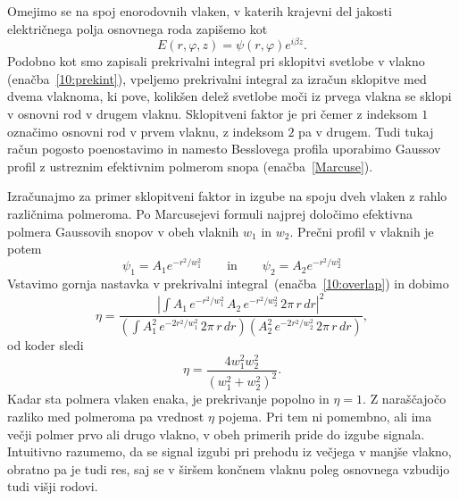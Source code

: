 Omejimo se na spoj enorodovnih vlaken, v katerih krajevni del jakosti 
električnega polja osnovnega roda zapišemo kot
\begin{equation}
E(r, \varphi, z)=\psi(r, \varphi) e^{i\beta z}.
\end{equation} 
Podobno kot smo zapisali prekrivalni integral pri sklopitvi svetlobe v vlakno (enačba~\ref{10:prekint}),
vpeljemo prekrivalni integral za izračun sklopitve med dvema vlaknoma,
ki pove, kolikšen delež svetlobe moči iz prvega vlakna 
se sklopi v osnovni rod v drugem vlaknu. Sklopitveni faktor je
pri čemer z indeksom $1$ označimo osnovni rod v prvem vlaknu, z indeksom $2$ pa 
v drugem. Tudi tukaj račun pogosto poenostavimo in namesto Besslovega profila uporabimo 
Gaussov profil z ustreznim efektivnim polmerom snopa (enačba~\ref{Marcuse}).

Izračunajmo za primer sklopitveni faktor in izgube na spoju dveh vlaken z rahlo 
različnima polmeroma. Po Marcusejevi formuli najprej določimo efektivna polmera Gaussovih snopov
v obeh vlaknih $w_1$ in $w_2$. Prečni profil v vlaknih je potem
\begin{equation}
\psi_{1} = A_{1} e^{-r^2/w_{1}^2} \qquad \mathrm{in} \qquad \psi_{2} = A_{2} e^{-r^2/w_{2}^2}
\end{equation}
Vstavimo gornja nastavka v prekrivalni integral~(enačba~\ref{10:overlap}) in dobimo
\begin{equation}
\eta = \frac{|\int A_1 \, e^{-r^2/w_1^2}\, A_2\, e^{-r^2/w_2^2}\, 2 \pi\, r\, dr|^2}
{\left(\int A_1^2 \,e^{-2r^2/w_1^2} \, 2 \pi \, r\, dr \right) \left( A_2^2\, 
e^{-2r^2/w_2^2}\, 2 \pi \, r\, dr \right)},
\label{10:prekintw}
\end{equation}
od koder sledi
\begin{equation}
\eta = \frac{4 w_1^2 w_2^2}{(w_1^2+w_2^2)^2}.
\label{10:w1w2}
\end{equation}
Kadar sta polmera vlaken enaka, je prekrivanje popolno in $\eta = 1$. Z naraščajočo razliko
med polmeroma pa vrednost $\eta$ pojema. Pri tem
ni pomembno, ali ima večji polmer prvo ali drugo vlakno, v obeh primerih pride do izgube 
signala. Intuitivno razumemo, da se signal izgubi pri prehodu iz večjega v manjše vlakno, 
obratno pa je tudi res, saj se v širšem končnem vlaknu poleg osnovnega vzbudijo
tudi višji rodovi. 

